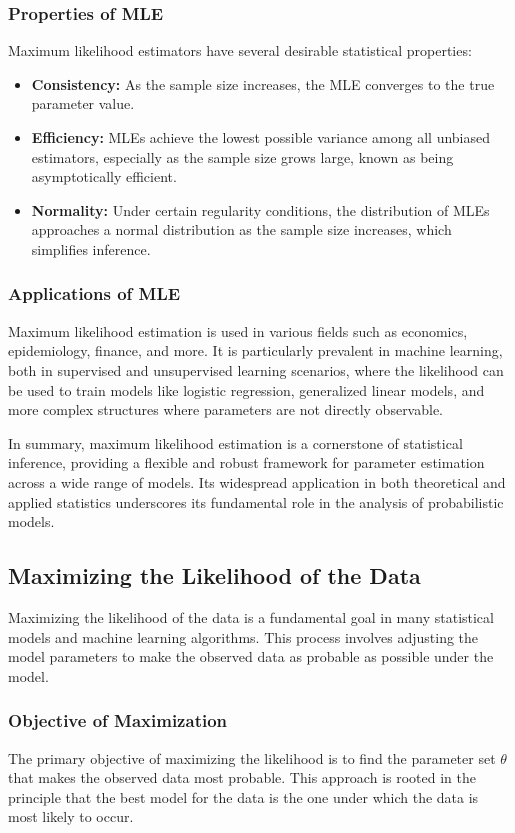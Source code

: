 \subsubsection{Properties of MLE}
Maximum likelihood estimators have several desirable statistical properties:
\begin{itemize}
    \item \textbf{Consistency:} As the sample size increases, the MLE converges to the true parameter value.
    \item \textbf{Efficiency:} MLEs achieve the lowest possible variance among all unbiased estimators, especially as the sample size grows large, known as being asymptotically efficient.
    \item \textbf{Normality:} Under certain regularity conditions, the distribution of MLEs approaches a normal distribution as the sample size increases, which simplifies inference.
\end{itemize}

\subsubsection{Applications of MLE}
Maximum likelihood estimation is used in various fields such as economics, epidemiology, finance, and more. It is particularly prevalent in machine learning, both in supervised and unsupervised learning scenarios, where the likelihood can be used to train models like logistic regression, generalized linear models, and more complex structures where parameters are not directly observable.

In summary, maximum likelihood estimation is a cornerstone of statistical inference, providing a flexible and robust framework for parameter estimation across a wide range of models. Its widespread application in both theoretical and applied statistics underscores its fundamental role in the analysis of probabilistic models.

\subsection{Maximizing the Likelihood of the Data}

Maximizing the likelihood of the data is a fundamental goal in many statistical models and machine learning algorithms. This process involves adjusting the model parameters to make the observed data as probable as possible under the model.

\subsubsection{Objective of Maximization}
The primary objective of maximizing the likelihood is to find the parameter set \( \theta \) that makes the observed data most probable. This approach is rooted in the principle that the best model for the data is the one under which the data is most likely to occur.

